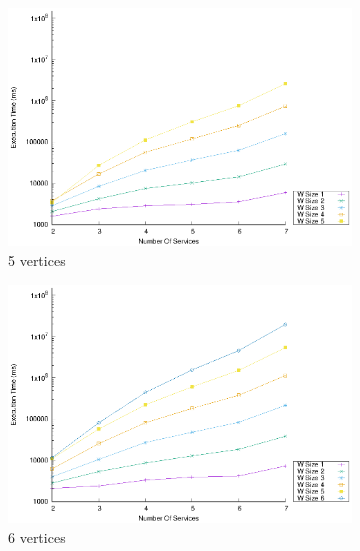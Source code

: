 \begin{figure}[!htb]
\begin{subfigure}{0.45\textwidth}
      \includegraphics[width=\textwidth]{Images/graphs/window_time_performance_qualitative_n7_s7_50_80_n5}
      \caption{5 vertices}
      \label{fig:time_window_perce_wide_5n}
    \end{subfigure}
    \hfill
    \begin{subfigure}{0.45\textwidth}
      \includegraphics[width=\textwidth]{Images/graphs/window_time_performance_qualitative_n7_s7_50_80_n6}
      \caption{6 vertices}
      \label{fig:time_window_perce_wide_6n}
    \end{subfigure}
    \begin{subfigure}{0.45\textwidth}

\end{subfigure}
\end{figure}
